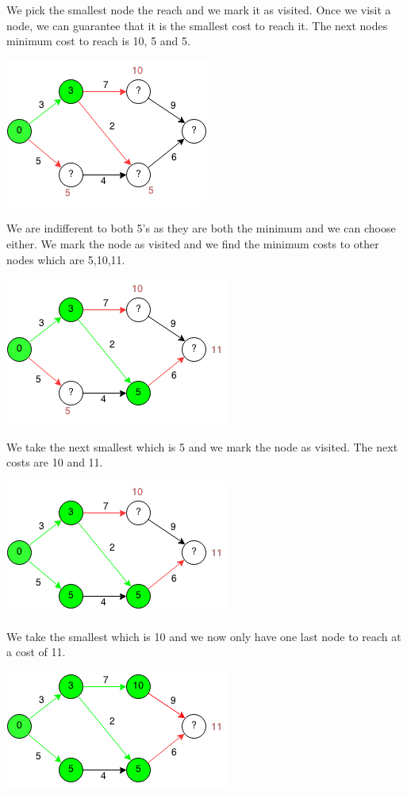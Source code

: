 \documentclass[11pt,oneside]{book}
\makeatletter
\def\maxwidth#1{\ifdim\Gin@nat@width>#1 #1\else\Gin@nat@width\fi}
\makeatother
\begin{document}
We pick the smallest node the reach and we mark it as visited. Once we visit a node, we can guarantee that it is the smallest cost to reach it. The next nodes minimum cost to reach is 10, 5 and 5.

\includegraphics[width=\maxwidth{\textwidth}]{djikstra2.png}

We are indifferent to both 5's as they are both the minimum and we can choose either. We mark the node as visited and we find the minimum costs to other nodes which are 5,10,11.

\includegraphics[width=\maxwidth{\textwidth}]{djikstra3.png}

We take the next smallest which is 5 and we mark the node as visited. The next costs are 10 and 11.

\includegraphics[width=\maxwidth{\textwidth}]{djikstra4.png}

We take the smallest which is 10 and we now only have one last node to reach at a cost of 11.

\includegraphics[width=\maxwidth{\textwidth}]{djikstra5.png}
\end{document}
